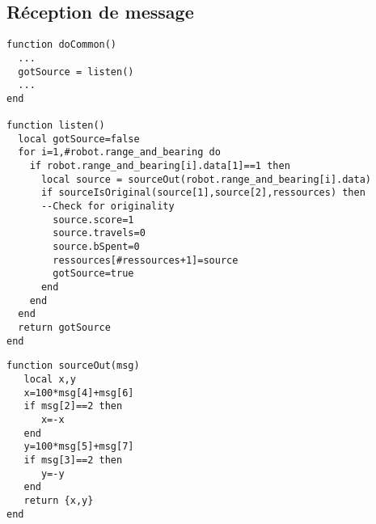 \begin{subappendices}
\subsection{Réception de message}

\begin{lstlisting}[caption=Ecoute du capteur à chaque pas]
function doCommon()
  ...
  gotSource = listen()
  ...
end

function listen()
  local gotSource=false
  for i=1,#robot.range_and_bearing do
    if robot.range_and_bearing[i].data[1]==1 then
      local source = sourceOut(robot.range_and_bearing[i].data)
      if sourceIsOriginal(source[1],source[2],ressources) then
      --Check for originality
        source.score=1
        source.travels=0
        source.bSpent=0
        ressources[#ressources+1]=source
        gotSource=true
      end
    end
  end
  return gotSource
end
\end{lstlisting}

\begin{lstlisting}[caption=Décodage du message]
function sourceOut(msg)
   local x,y
   x=100*msg[4]+msg[6]
   if msg[2]==2 then
      x=-x
   end
   y=100*msg[5]+msg[7]
   if msg[3]==2 then
      y=-y
   end
   return {x,y}
end
\end{lstlisting}

\end{subappendices}
